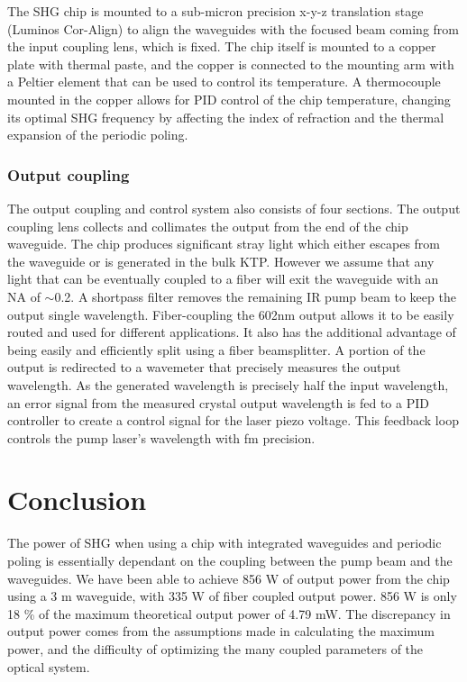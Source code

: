 \documentclass[9pt,twocolumn,twoside]{pnas-new}
\begin{document}
The SHG chip is mounted to a sub-micron precision x-y-z translation stage (Luminos Cor-Align) to align the waveguides with the focused beam coming from the input coupling lens, which is fixed. The chip itself is mounted to a copper plate with thermal paste, and the copper is connected to the mounting arm with a Peltier element that can be used to control its temperature. A thermocouple mounted in the copper allows for PID control of the chip temperature, changing its optimal SHG frequency by affecting the index of refraction and the thermal expansion of the periodic poling. 

	
\subsubsection*{Output coupling}
The output coupling and control system also consists of four sections. The output coupling lens collects and collimates the output from the end of the chip waveguide. The chip produces significant stray light which either escapes from the waveguide or is generated in the bulk KTP. However we assume that any light that can be eventually coupled to a fiber will exit the waveguide with an NA of $\sim$0.2. A shortpass filter removes the remaining IR pump beam to keep the output single wavelength. Fiber-coupling the 602nm output allows it to be easily routed and used for different applications. It also has the additional advantage of being easily and efficiently split using a fiber beamsplitter. A portion of the output is redirected to a wavemeter that precisely measures the output wavelength. As the generated wavelength is precisely half the input wavelength, an error signal from the measured crystal output wavelength is fed to a PID controller to create a control signal for the laser piezo voltage. This feedback loop controls the pump laser's wavelength with fm precision. 
		
\section*{Conclusion}
The power of SHG when using a chip with integrated waveguides and periodic poling is essentially dependant on the coupling between the pump beam and the waveguides. We have been able to achieve  856 \textmu W of output power from the chip using a 3 \textmu m waveguide, with 335 \textmu W of fiber coupled output power. 856 \textmu W is only 18 \% of the maximum theoretical output power of 4.79 mW. The discrepancy in output power comes from the assumptions made in calculating the maximum power, and the difficulty of optimizing the many coupled parameters of the optical system. 
\end{document}
